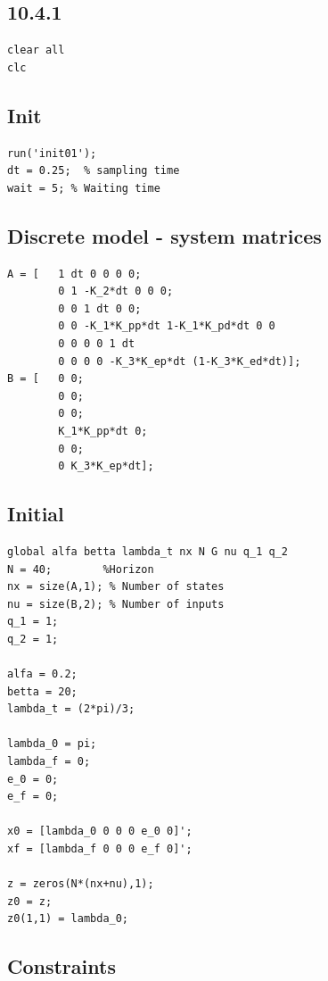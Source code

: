 \documentclass[11pt,a4paper,USenglish]{article} %
\begin{document}
\subsection{10.4.1}
\begin{verbatim}
clear all
clc
\end{verbatim}


\subsection*{Init}

\begin{verbatim}
run('init01');
dt = 0.25;  % sampling time
wait = 5; % Waiting time
\end{verbatim}

\subsection*{Discrete model - system matrices}

\begin{verbatim}
A = [   1 dt 0 0 0 0;
        0 1 -K_2*dt 0 0 0;
        0 0 1 dt 0 0;
        0 0 -K_1*K_pp*dt 1-K_1*K_pd*dt 0 0
        0 0 0 0 1 dt
        0 0 0 0 -K_3*K_ep*dt (1-K_3*K_ed*dt)];
B = [   0 0;
        0 0;
        0 0;
        K_1*K_pp*dt 0;
        0 0;
        0 K_3*K_ep*dt];
\end{verbatim}


\subsection*{Initial}

\begin{verbatim}
global alfa betta lambda_t nx N G nu q_1 q_2
N = 40;        %Horizon
nx = size(A,1); % Number of states
nu = size(B,2); % Number of inputs
q_1 = 1;
q_2 = 1;

alfa = 0.2;
betta = 20;
lambda_t = (2*pi)/3;

lambda_0 = pi;
lambda_f = 0;
e_0 = 0;
e_f = 0;

x0 = [lambda_0 0 0 0 e_0 0]';
xf = [lambda_f 0 0 0 e_f 0]';

z = zeros(N*(nx+nu),1);
z0 = z;
z0(1,1) = lambda_0;
\end{verbatim}


\subsection*{Constraints}
\end{document}
